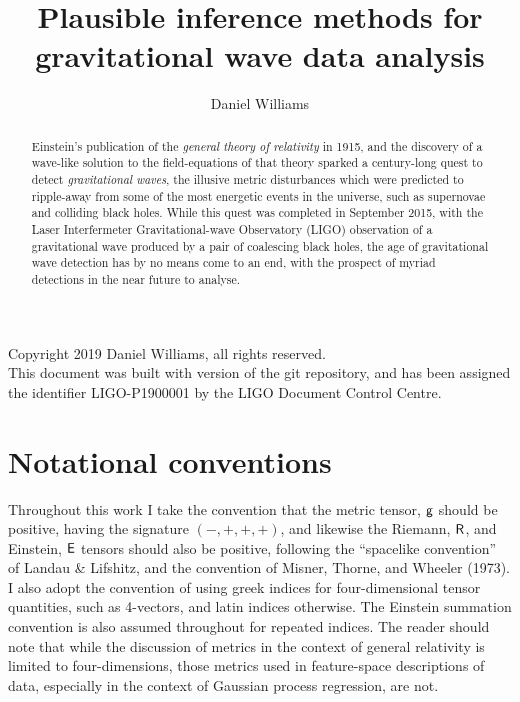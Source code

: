 \documentclass{kentigern}
\title{Plausible inference methods for gravitational wave data analysis}
\author{Daniel Williams}
\theoremstyle{definition}
\begin{document}
\openright
\frontmatter
\thesistitle
\newpage \newpage

\begin{abstract}
  Einstein's publication of the \textit{general theory of relativity} in 1915, and the discovery of a wave-like solution to the field-equations of that theory sparked a century-long quest to detect \textit{gravitational waves},
  the illusive metric disturbances which were predicted to ripple-away from some of the most energetic events in the universe, such as supernovae and colliding black holes.
  While this quest was completed in September 2015, with the Laser Interfermeter Gravitational-wave Observatory (LIGO) observation of a gravitational wave produced by a pair of coalescing black holes,
  the age of gravitational wave detection has by no means come to an end,
  with the prospect of myriad detections in the near future to analyse.
\end{abstract}
\newpage

Copyright 2019 Daniel Williams, all rights reserved.\\

This document was built with version  of the git repository, and has been assigned the identifier LIGO-P1900001 by the LIGO Document Control Centre.

\newpage
\tableofcontents
\newpage
\listoffigures
\newpage
\listoftables
\newpage

\printglossary[type=\acronymtype]


%
\newpage
\section{Notational conventions}
\label{sec:notation-conventions}

Throughout this work I take the convention that the metric tensor, $\mathsf{g}$ should be positive, having the signature $(-,+,+,+)$, and likewise the Riemann, $\mathsf{R}$, and Einstein, $\mathsf{E}$ tensors should also be positive, following the ``spacelike convention'' of Landau \& Lifshitz, and the convention of Misner, Thorne, and Wheeler (1973). I also adopt the convention of using greek indices for four-dimensional tensor quantities, such as 4-vectors, and latin indices otherwise. The Einstein summation convention is also assumed throughout for repeated indices. The reader should note that while the discussion of metrics in the context of general relativity is limited to four-dimensions, those metrics used in feature-space descriptions of data, especially in the context of Gaussian process regression, are not. 
\end{document}
